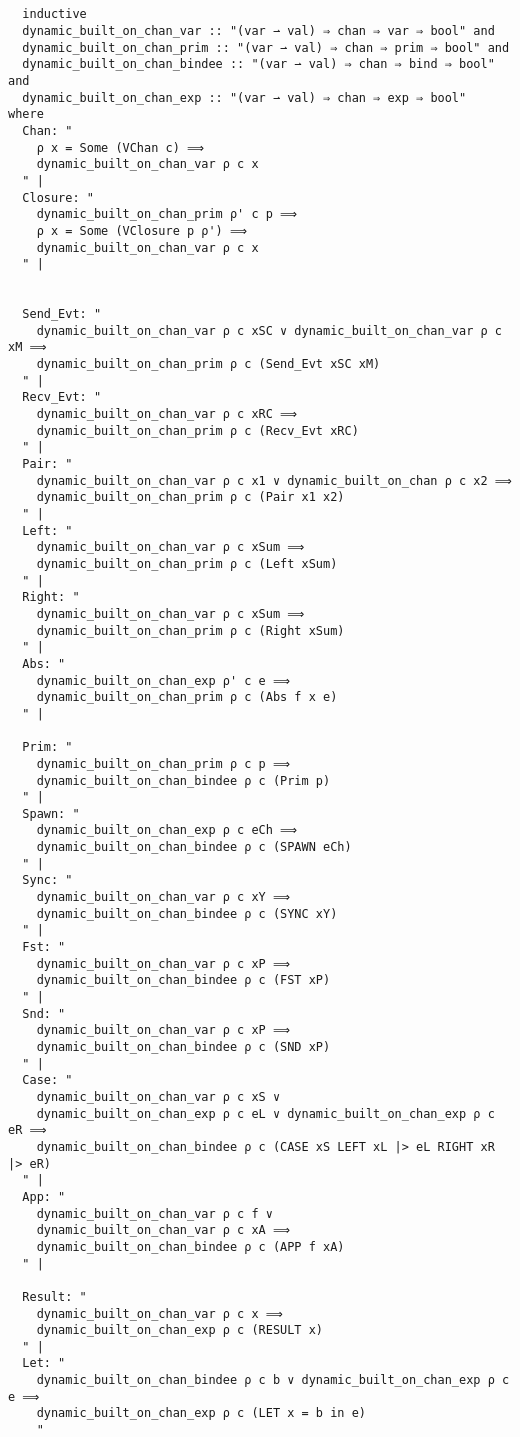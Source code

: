 \documentclass{article}
\begin{document}
\begin{lstlisting}[style=codestyle1, escapechar=\%]


  inductive 
  dynamic_built_on_chan_var :: "(var ⇀ val) ⇒ chan ⇒ var ⇒ bool" and
  dynamic_built_on_chan_prim :: "(var ⇀ val) ⇒ chan ⇒ prim ⇒ bool" and
  dynamic_built_on_chan_bindee :: "(var ⇀ val) ⇒ chan ⇒ bind ⇒ bool" and
  dynamic_built_on_chan_exp :: "(var ⇀ val) ⇒ chan ⇒ exp ⇒ bool" 
where
  Chan: "
    ρ x = Some (VChan c) ⟹
    dynamic_built_on_chan_var ρ c x
  " |
  Closure: "
    dynamic_built_on_chan_prim ρ' c p ⟹
    ρ x = Some (VClosure p ρ') ⟹
    dynamic_built_on_chan_var ρ c x
  " |


  Send_Evt: "
    dynamic_built_on_chan_var ρ c xSC ∨ dynamic_built_on_chan_var ρ c xM ⟹
    dynamic_built_on_chan_prim ρ c (Send_Evt xSC xM)
  " |
  Recv_Evt: "
    dynamic_built_on_chan_var ρ c xRC ⟹
    dynamic_built_on_chan_prim ρ c (Recv_Evt xRC)
  " |
  Pair: "
    dynamic_built_on_chan_var ρ c x1 ∨ dynamic_built_on_chan ρ c x2 ⟹
    dynamic_built_on_chan_prim ρ c (Pair x1 x2)
  " |
  Left: "
    dynamic_built_on_chan_var ρ c xSum ⟹
    dynamic_built_on_chan_prim ρ c (Left xSum)
  " |
  Right: "
    dynamic_built_on_chan_var ρ c xSum ⟹
    dynamic_built_on_chan_prim ρ c (Right xSum)
  " |
  Abs: "
    dynamic_built_on_chan_exp ρ' c e ⟹
    dynamic_built_on_chan_prim ρ c (Abs f x e)
  " |

  Prim: "
    dynamic_built_on_chan_prim ρ c p ⟹
    dynamic_built_on_chan_bindee ρ c (Prim p)
  " |
  Spawn: "
    dynamic_built_on_chan_exp ρ c eCh ⟹
    dynamic_built_on_chan_bindee ρ c (SPAWN eCh)
  " |
  Sync: "
    dynamic_built_on_chan_var ρ c xY ⟹
    dynamic_built_on_chan_bindee ρ c (SYNC xY)
  " |
  Fst: "
    dynamic_built_on_chan_var ρ c xP ⟹
    dynamic_built_on_chan_bindee ρ c (FST xP)
  " |
  Snd: "
    dynamic_built_on_chan_var ρ c xP ⟹
    dynamic_built_on_chan_bindee ρ c (SND xP)
  " |
  Case: "
    dynamic_built_on_chan_var ρ c xS ∨ 
    dynamic_built_on_chan_exp ρ c eL ∨ dynamic_built_on_chan_exp ρ c eR ⟹
    dynamic_built_on_chan_bindee ρ c (CASE xS LEFT xL |> eL RIGHT xR |> eR)
  " |
  App: "
    dynamic_built_on_chan_var ρ c f ∨
    dynamic_built_on_chan_var ρ c xA ⟹
    dynamic_built_on_chan_bindee ρ c (APP f xA)
  " |

  Result: "
    dynamic_built_on_chan_var ρ c x ⟹
    dynamic_built_on_chan_exp ρ c (RESULT x)
  " |
  Let: "
    dynamic_built_on_chan_bindee ρ c b ∨ dynamic_built_on_chan_exp ρ c e ⟹
    dynamic_built_on_chan_exp ρ c (LET x = b in e)
    "
    
  \end{lstlisting}
\end{document}
